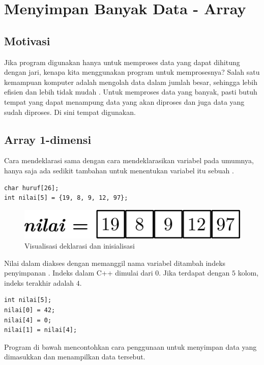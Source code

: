\documentclass[../main.tex]{subfiles}
\begin{document}
\chapter{Menyimpan Banyak Data - Array}
\section{Motivasi}
Jika program digunakan hanya untuk memproses data yang dapat dihitung dengan jari, kenapa kita menggunakan program untuk memprosesnya? Salah satu kemampuan komputer adalah mengolah data dalam jumlah besar, sehingga lebih efisien dan lebih tidak mudah . Untuk memproses data yang banyak, pasti butuh tempat yang dapat menampung data yang akan diproses dan juga data yang sudah diproses. Di sini tempat  digunakan.

\section{Array 1-dimensi}
Cara mendeklarasi  sama dengan cara mendeklarasikan variabel pada umumnya, hanya saja ada sedikit tambahan  untuk menentukan variabel itu sebuah .

\begin{verbatim}
char huruf[26];
int nilai[5] = {19, 8, 9, 12, 97};
\end{verbatim}

\begin{figure}[h]
\centering
\includegraphics[scale=0.5]{img/array_1_dec_init}
\caption{Visualisasi deklarasi dan inisialisasi }
\label{arr:decinit}
\end{figure}

Nilai dalam  diakses dengan memanggil nama variabel ditambah indeks penyimpanan . Indeks  dalam C++ dimulai dari \(0\). Jika terdapat  dengan \(5\) kolom, indeks terakhir adalah \(4\).

\begin{verbatim}
int nilai[5];
nilai[0] = 42;
nilai[4] = 0;
nilai[1] = nilai[4];
\end{verbatim}

Program di bawah mencontohkan cara penggunaan  untuk menyimpan data yang dimasukkan dan menampilkan data tersebut.
\end{document}
